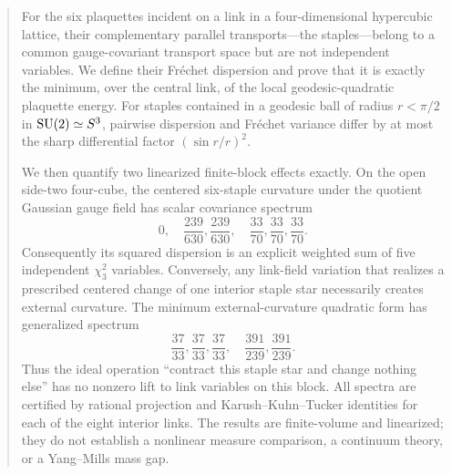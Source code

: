 \begin{abstract}
For the six plaquettes incident on a link in a four-dimensional hypercubic
lattice, their complementary parallel transports---the staples---belong to a
common gauge-covariant transport space but are not independent variables.  We
define their Fr\'echet dispersion and prove that it is exactly the minimum,
over the central link, of the local geodesic-quadratic plaquette energy.  For
staples contained in a geodesic ball of radius $r<\pi/2$ in
$\SU\simeq S^3$, pairwise dispersion and Fr\'echet variance differ by at most
the sharp differential factor $(\sin r/r)^2$.

We then quantify two linearized finite-block effects exactly.  On the open
side-two four-cube, the centered six-staple curvature under the quotient
Gaussian gauge field has scalar covariance spectrum
\[
  0,\quad \frac{239}{630},\frac{239}{630},\quad
  \frac{33}{70},\frac{33}{70},\frac{33}{70}.
\]
Consequently its squared dispersion is an explicit weighted sum of five
independent $\chi^2_3$ variables.  Conversely, any link-field variation that
realizes a prescribed centered change of one interior staple star necessarily
creates external curvature.  The minimum external-curvature quadratic form
has generalized spectrum
\[
  \frac{37}{33},\frac{37}{33},\frac{37}{33},\quad
  \frac{391}{239},\frac{391}{239}.
\]
Thus the ideal operation ``contract this staple star and change nothing
else'' has no nonzero lift to link variables on this block.  All spectra are
certified by rational projection and Karush--Kuhn--Tucker identities for each
of the eight interior links.  The results are finite-volume and linearized;
they do not establish a nonlinear measure comparison, a continuum theory, or
a Yang--Mills mass gap.
\end{abstract}

